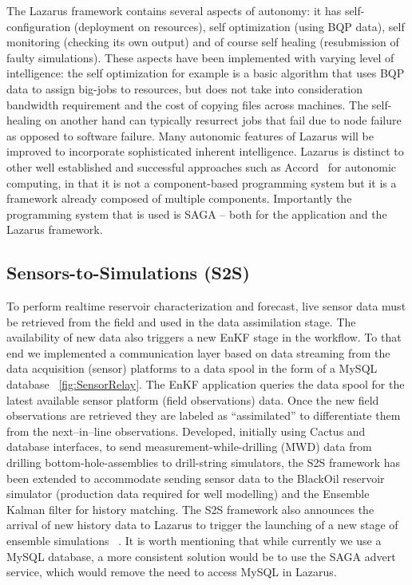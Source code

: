 \documentclass{acm_proc_article-sp}
\begin{document}
The Lazarus framework contains several aspects of autonomy: it has
self-configuration (deployment on resources), self optimization (using
BQP data), self monitoring (checking its own output) and of course
self healing (resubmission of faulty simulations). These aspects have
been implemented with varying level of intelligence: the self
optimization for example is a basic algorithm that uses BQP data to
assign big-jobs to resources, but does not take into consideration
bandwidth requirement and the cost of copying files across
machines. The self-healing on another hand can typically resurrect
jobs that fail due to node failure as opposed to software
failure. Many autonomic features of Lazarus will be improved to
incorporate sophisticated inherent intelligence.  Lazarus is distinct
to other well established and successful approaches such as
Accord~\cite{accord} for autonomic computing, in that it is not a
component-based programming system but it is a framework already
composed of multiple components. Importantly the programming system
that is used is SAGA -- both for the application and the Lazarus
framework.


\subsection{Sensors-to-Simulations (S2S)} 

To perform realtime reservoir characterization and forecast, live
sensor data must be retrieved from the field and used in the data
assimilation stage. The availability of new data also triggers a new
EnKF stage in the workflow. To that end we implemented a communication
layer based on data streaming from the data acquisition (sensor)
platforms to a data spool in the form of a MySQL database
~\ref{fig:SensorRelay}. The EnKF application queries the data spool
for the latest available sensor platform (field observations)
data. Once the new field observations are retrieved they are labeled
as ``assimilated'' to differentiate them from the next--in--line
observations.  Developed, initially using Cactus and database
interfaces, to send measurement-while-drilling (MWD) data from
drilling bottom-hole-assemblies to drill-string simulators, the S2S
framework has been extended to accommodate sending sensor data to the
BlackOil reservoir simulator (production data required for well
modelling) and the Ensemble Kalman filter for history matching. The
S2S framework also announces the arrival of new history data to
Lazarus to trigger the launching of a new stage of ensemble
simulations ~\cite{Duff1,Duff2}.  It is worth mentioning that while
currently we use a MySQL database, a more consistent solution would be
to use the SAGA advert service, which would remove the need to access
MySQL in Lazarus.
\end{document}
